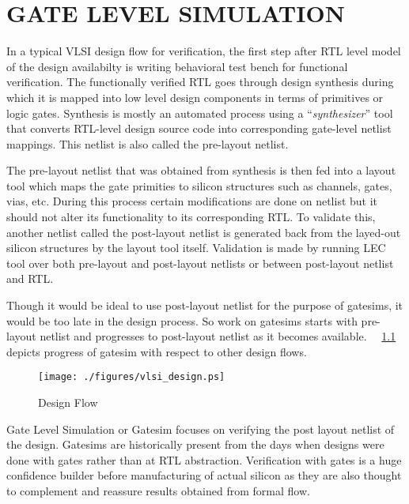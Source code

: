 \chapter{GATE LEVEL SIMULATION}
\label{chap:gate_intro.tex}

In a typical VLSI design flow for verification, the first step after RTL level model of the design availabilty is writing behavioral test bench for functional verification. The functionally verified RTL goes through design synthesis during which it is mapped into low level design components in terms of primitives or logic gates. Synthesis is mostly an automated process using a ``{\it synthesizer}'' tool that converts RTL-level design source code into corresponding gate-level netlist mappings. This netlist is also called the pre-layout netlist.

The pre-layout netlist that was obtained from synthesis is then fed into a layout tool which maps the gate primities to silicon structures such as channels, gates, vias, etc. During this process certain modifications are done on netlist but it should not alter its functionality to its corresponding RTL. To validate this, another netlist called the post-layout netlist is generated back from the layed-out silicon structures by the layout tool itself. Validation is made by running LEC tool over both pre-layout and post-layout netlists or between post-layout netlist and RTL.

Though it would be ideal to use post-layout netlist for the purpose of gatesims, it would be too late in the design process. So work on gatesims starts with pre-layout netlist and progresses to post-layout netlist as it becomes available. ~\figurename{~\ref{fig:vlsi_design.ps}} depicts progress of gatesim with respect to other design flows.

\begin{figure}[h]
\centering
\texttt{[image: ./figures/vlsi\_design.ps]}
\caption{Design Flow}
\label{fig:vlsi_design.ps}
\end{figure}
Gate Level Simulation or Gatesim focuses on verifying the post layout netlist of the design. Gatesims are historically present from the days when designs were done with gates rather than at RTL abstraction. Verification with gates is a huge confidence builder before manufacturing of actual silicon as they are also thought to complement and reassure results obtained from formal flow.


